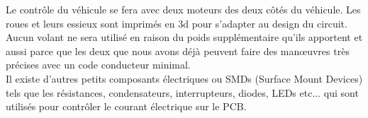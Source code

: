 	Le contrôle du véhicule se fera avec deux moteurs des deux côtés du véhicule. Les 
roues et leurs essieux sont imprimés en 3d pour s'adapter au design du circuit. Aucun 
volant ne sera utilisé en raison du poids supplémentaire qu'ils apportent et aussi 
parce que les deux que nous avons déjà peuvent faire des manœuvres très précises 
avec un code conducteur minimal. \\


   Il existe d'autres petits composants électriques ou SMDs (Surface Mount Devices) 
tels que les résistances, condensateurs, interrupteurs, diodes, LEDs etc... qui sont 
utilisés pour contrôler le courant électrique sur le PCB.
